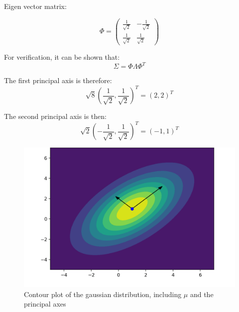 \documentclass{homeworg}
\begin{document}
Eigen vector matrix:

\begin{equation}
    \Phi =
    \begin{pmatrix}
        \frac{1}{\sqrt{2}} & -\frac{1}{\sqrt{2}} \\
        \frac{1}{\sqrt{2}} & \frac{1}{\sqrt{2}}
    \end{pmatrix}
\end{equation}

For verification, it can be shown that:
\begin{equation}
    \Sigma = \Phi\Lambda\Phi^T
\end{equation}


The first principal axis is therefore:
\begin{equation}
    \sqrt{8}\left(\frac{1}{\sqrt{2}}, \frac{1}{\sqrt{2}}\right)^T = (2, 2)^T
\end{equation}

The second principal axis is then:
\begin{equation}
    \sqrt{2}\left(-\frac{1}{\sqrt{2}}, \frac{1}{\sqrt{2}}\right)^T = (-1, 1)^T
\end{equation}

\begin{figure}[H]
    \centering
    \includegraphics[scale=0.9]{Figure2.png}
    \caption{Contour plot of the gaussian distribution, including $\mu$ and the principal axes}
\end{figure}
\end{document}
